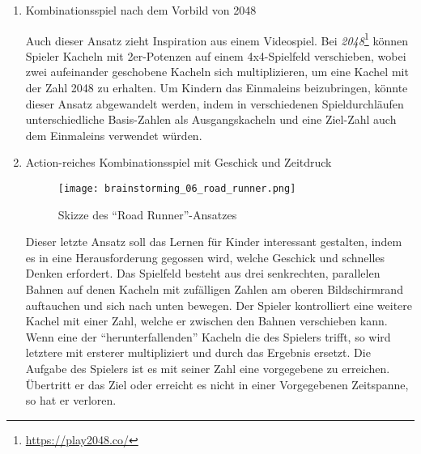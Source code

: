 \begin{enumerate}
  Dieser Ansatz ist inspiriert durch das Videospiel \emph{Dorfromantik}\footnote{\url{https://toukana.com/dorfromantik/}}, in dem verschiedene hexagonale Landschafts-Kacheln auf einem Spielbrett derart angebracht werden müssen, dass sie Synergie-Effekte erzielen.
  Wenn sich das Spielprinzip so anpassen ließe, dass eine Spielerin Kacheln mit verschiedenen Zahlen so platzieren müsste, dass bei der Multiplikation von aneinanderliegenden Kacheln bestimmte Ergebnisse erzielt würden---ähnlich einem Sudoku---so könnte dies eine für Kinder anregende Lernmechanik darstellen.

  \item Kombinationsspiel nach dem Vorbild von 2048
  
  Auch dieser Ansatz zieht Inspiration aus einem Videospiel. Bei \emph{2048}\footnote{\url{https://play2048.co/}} können Spieler Kacheln mit 2er-Potenzen auf einem 4x4-Spielfeld verschieben, wobei zwei aufeinander geschobene Kacheln sich multiplizieren, um eine Kachel mit der Zahl 2048 zu erhalten.
  Um Kindern das Einmaleins beizubringen, könnte dieser Ansatz abgewandelt werden, indem in verschiedenen Spieldurchläufen unterschiedliche Basis-Zahlen als Ausgangskacheln und eine Ziel-Zahl auch dem Einmaleins verwendet würden.

  \item Action-reiches Kombinationsspiel mit Geschick und Zeitdruck
  
  \begin{figure}[h]
    \centering
    \texttt{[image: brainstorming\_06\_road\_runner.png]}
    \caption{Skizze des \enquote{Road Runner}-Ansatzes}
  \end{figure}

  Dieser letzte Ansatz soll das Lernen für Kinder interessant gestalten, indem es in eine Herausforderung gegossen wird, welche Geschick und schnelles Denken erfordert.
  Das Spielfeld besteht aus drei senkrechten, parallelen Bahnen auf denen Kacheln mit zufälligen Zahlen am oberen Bildschirmrand auftauchen und sich nach unten bewegen.
  Der Spieler kontrolliert eine weitere Kachel mit einer Zahl, welche er zwischen den Bahnen verschieben kann.
  Wenn eine der \enquote{herunterfallenden} Kacheln die des Spielers trifft, so wird letztere mit ersterer multipliziert und durch das Ergebnis ersetzt.
  Die Aufgabe des Spielers ist es mit seiner Zahl eine vorgegebene zu erreichen.
  Übertritt er das Ziel oder erreicht es nicht in einer Vorgegebenen Zeitspanne, so hat er verloren. 

\end{enumerate}

